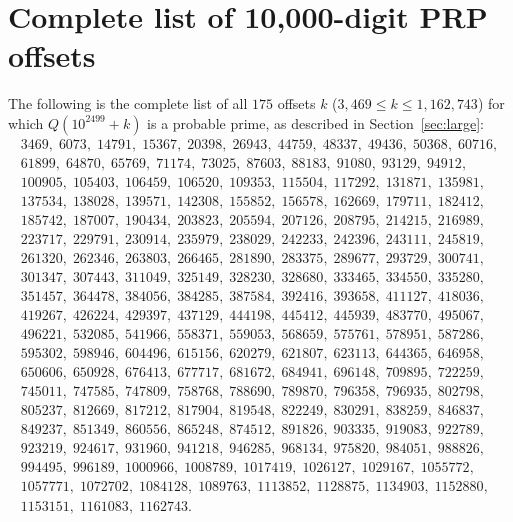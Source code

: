 \documentclass[11pt,a4paper]{article}
\theoremstyle{plain}
\theoremstyle{definition}
\theoremstyle{remark}
\begin{document}
\section{Complete list of 10,000-digit PRP offsets}
\label{app:offsets}

The following is the complete list of all $175$ offsets $k$ ($3{,}469 \le k \le 1{,}162{,}743$) for which $Q(10^{2499}+k)$ is a probable prime, as described in Section~\ref{sec:large}:
\begin{gather*}
3469,\; 6073,\; 14791,\; 15367,\; 20398,\; 26943,\; 44759,\; 48337,\; 49436,\; 50368,\; 60716, \\
61899,\; 64870,\; 65769,\; 71174,\; 73025,\; 87603,\; 88183,\; 91080,\; 93129,\; 94912, \\
100905,\; 105403,\; 106459,\; 106520,\; 109353,\; 115504,\; 117292,\; 131871,\; 135981, \\
137534,\; 138028,\; 139571,\; 142308,\; 155852,\; 156578,\; 162669,\; 179711,\; 182412, \\
185742,\; 187007,\; 190434,\; 203823,\; 205594,\; 207126,\; 208795,\; 214215,\; 216989, \\
223717,\; 229791,\; 230914,\; 235979,\; 238029,\; 242233,\; 242396,\; 243111,\; 245819, \\
261320,\; 262346,\; 263803,\; 266465,\; 281890,\; 283375,\; 289677,\; 293729,\; 300741, \\
301347,\; 307443,\; 311049,\; 325149,\; 328230,\; 328680,\; 333465,\; 334550,\; 335280, \\
351457,\; 364478,\; 384056,\; 384285,\; 387584,\; 392416,\; 393658,\; 411127,\; 418036, \\
419267,\; 426224,\; 429397,\; 437129,\; 444198,\; 445412,\; 445939,\; 483770,\; 495067, \\
496221,\; 532085,\; 541966,\; 558371,\; 559053,\; 568659,\; 575761,\; 578951,\; 587286, \\
595302,\; 598946,\; 604496,\; 615156,\; 620279,\; 621807,\; 623113,\; 644365,\; 646958, \\
650606,\; 650928,\; 676413,\; 677717,\; 681672,\; 684941,\; 696148,\; 709895,\; 722259, \\
745011,\; 747585,\; 747809,\; 758768,\; 788690,\; 789870,\; 796358,\; 796935,\; 802798, \\
805237,\; 812669,\; 817212,\; 817904,\; 819548,\; 822249,\; 830291,\; 838259,\; 846837, \\
849237,\; 851349,\; 860556,\; 865248,\; 874512,\; 891826,\; 903335,\; 919083,\; 922789, \\
923219,\; 924617,\; 931960,\; 941218,\; 946285,\; 968134,\; 975820,\; 984051,\; 988826, \\
994495,\; 996189,\; 1000966,\; 1008789,\; 1017419,\; 1026127,\; 1029167,\; 1055772, \\
1057771,\; 1072702,\; 1084128,\; 1089763,\; 1113852,\; 1128875,\; 1134903,\; 1152880, \\
1153151,\; 1161083,\; 1162743.
\end{gather*}
\end{document}
